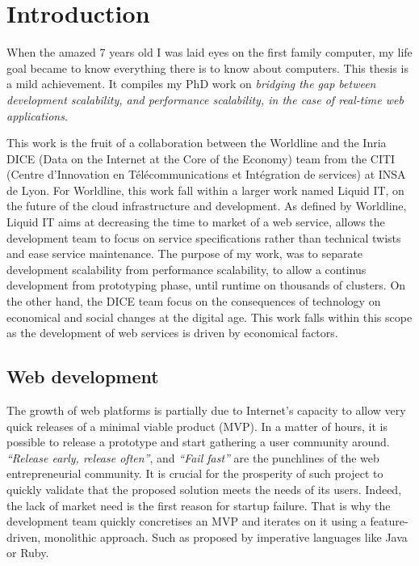 \chapter{Introduction} \label{chapter:conclusion}

When the amazed 7 years old I was laid eyes on the first family computer, my life goal became to know everything there is to know about computers.
This thesis is a mild achievement.
It compiles my PhD work on
\textit{bridging the gap between development scalability, and performance scalability, in the case of real-time web applications}.


This work is the fruit of a collaboration between the Worldline and the Inria DICE (Data on the Internet at the Core of the Economy) team from the CITI (Centre d’Innovation en Télécommunications et Intégration
de services) at INSA de Lyon.
For Worldline, this work fall within a larger work named Liquid IT, on the future of the cloud infrastructure and development.
As defined by Worldline, Liquid IT aims at decreasing the time to market of a web service, allows the development team to focus on service specifications rather than technical twists and ease service maintenance.
The purpose of my work, was to separate development scalability from performance scalability, to allow a continus development from prototyping phase, until runtime on thousands of clusters.
On the other hand, the DICE team focus on the consequences of technology on economical and social changes at the digital age.
This work falls within this scope as the development of web services is driven by economical factors.

\section{Web development}

The growth of web platforms is partially due to Internet's capacity to allow very quick releases of a minimal viable product (MVP).
In a matter of hours, it is possible to release a prototype and start gathering a user community around.
\textit{``Release early, release often''}, and \textit{``Fail fast''} are the punchlines of the web entrepreneurial community.
It is crucial for the prosperity of such project to quickly validate that the proposed solution meets the needs of its users.
Indeed, the lack of market need is the first reason for startup failure.
That is why the development team quickly concretises an MVP and iterates on it using a feature-driven, monolithic approach.
Such as proposed by imperative languages like Java or Ruby.

